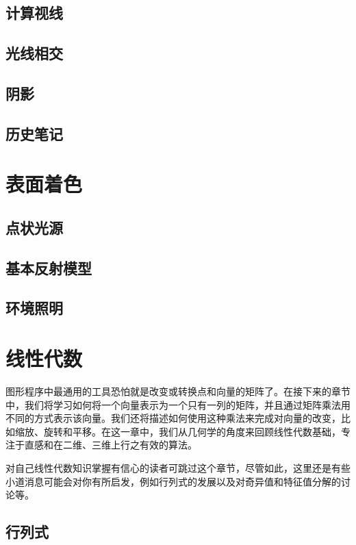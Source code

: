 \documentclass[lang=cn,12pt]{elegantbook}
\begin{document}
\section{计算视线}

\section{光线相交}

\section{阴影}

\section{历史笔记}

\chapter{表面着色}

\section{点状光源}


\section{基本反射模型}


\section{环境照明}

\chapter{线性代数}

图形程序中最通用的工具恐怕就是改变或转换点和向量的矩阵了。在接下来的章节中，我们将学习如何将一个向量表示为一个只有一列的矩阵，并且通过矩阵乘法用不同的方式表示该向量。我们还将描述如何使用这种乘法来完成对向量的改变，比如缩放、旋转和平移。在这一章中，我们从几何学的角度来回顾线性代数基础，专注于直感和在二维、三维上行之有效的算法。

对自己线性代数知识掌握有信心的读者可跳过这个章节，尽管如此，这里还是有些小道消息可能会对你有所启发，例如行列式的发展以及对奇异值和特征值分解的讨论等。

\section{行列式}
\end{document}
